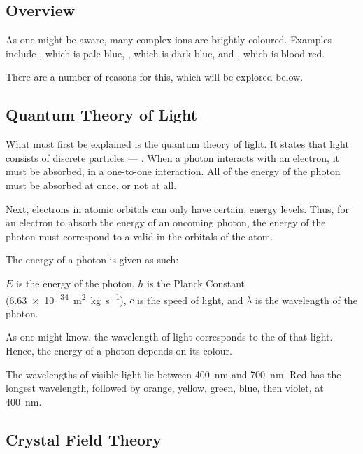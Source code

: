 		\subsection{Overview}

			As one might be aware, many complex ions are brightly coloured. Examples include , which is pale blue,
			, which is dark blue, and , which is blood red.

			There are a number of reasons for this, which will be explored below.



		\subsection{Quantum Theory of Light}

			What must first be explained is the quantum theory of light. It states that light consists of discrete particles --- .
			When a photon interacts with an electron, it must be  absorbed, in a one-to-one interaction. All of the energy of
			the photon must be absorbed at once, or not at all.

			Next, electrons in atomic orbitals can only have certain,  energy levels. Thus, for an electron to absorb the energy
			of an oncoming photon, the energy of the photon must correspond  to a valid  in the orbitals of
			the atom.

			The energy of a photon is given as such:

			\mathdiagram{
				\[ E = \frac{hc}{\lambda} \]
			}

			$E$ is the energy of the photon, $h$ is the Planck Constant (\SI{6.63e-34}{\square\metre\kilo\gram\per\second}), $c$ is
			the speed of light, and $\lambda$ is the wavelength of the photon.

			As one might know, the wavelength of light corresponds to the  of that light. Hence, the energy of a photon depends
			on its colour.

			The wavelengths of visible light lie between \SI{400}{\nano\metre} and \SI{700}{\nano\metre}. Red has the longest wavelength,
			followed by orange, yellow, green, blue, then violet, at \SI{400}{\nano\metre}.



		\pagebreak
		\subsection{Crystal Field Theory}

